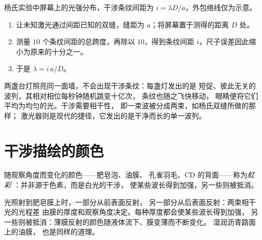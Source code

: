 \begin{omfigure}

{\small 杨氏实验中屏幕上的光强分布，干涉条纹间距为
$i = \lambda D/a$，外包络线仅为示意。}
\end{omfigure}

\begin{method}[测量波长]\label{met:g12:light-as-wave:lambda}
\begin{enumerate}
  \item 让未知激光通过间距已知的双缝，缝距为
        $a$；将屏幕置于测得的距离 $D$ 处。
  \item 测量 $10$ 个条纹间距的总跨度，再除以 $10$，得到条纹间距
        $i$，尺子误差因此缩小为原来的十分之一。
  \item 于是 $\lambda = i\,a/D$。
\end{enumerate}
\end{method}

\begin{remark}[两盏台灯为何不产生干涉]\label{rem:g12:light-as-wave:lamps}
两盏台灯照亮同一面墙，不会出现干涉条纹：每盏灯发出的是
短促、彼此无关的波列，其相对相位每秒钟随机跳变十亿次，
条纹也随之飞快移动，
眼睛便将它们平均为均匀的光。干涉需要相干性，
即一束波被分成两束，如杨氏双缝所做的那样；
激光器则是现代的捷径，它发出的是干净而长的单一波列。
\end{remark}

\section{干涉描绘的颜色}

\begin{definition}[虹彩]\label{def:g12:light-as-wave:iridescence}
随观察角度而变化的颜色——肥皂泡、油膜、
孔雀羽毛、CD 的背面——称为\emph{虹彩}%
：并非源于色素，而是白光的干涉，
使某些波长得到加强，另一些则被抵消。
\end{definition}

\begin{example}[肥皂膜与油膜]\label{ex:g12:light-as-wave:soap}
光照射到肥皂膜上时，一部分从前表面反射，
另一部分从后表面反射：两束相干光的光程差
由膜的厚度和观察角度决定。每种厚度都会使某些波长得到加强，
另一些则被抵消：薄膜反射的颜色随液体流下、膜变薄而不断变化。
湿润沥青路面上的油膜，
也是同样的道理。
\end{example}

